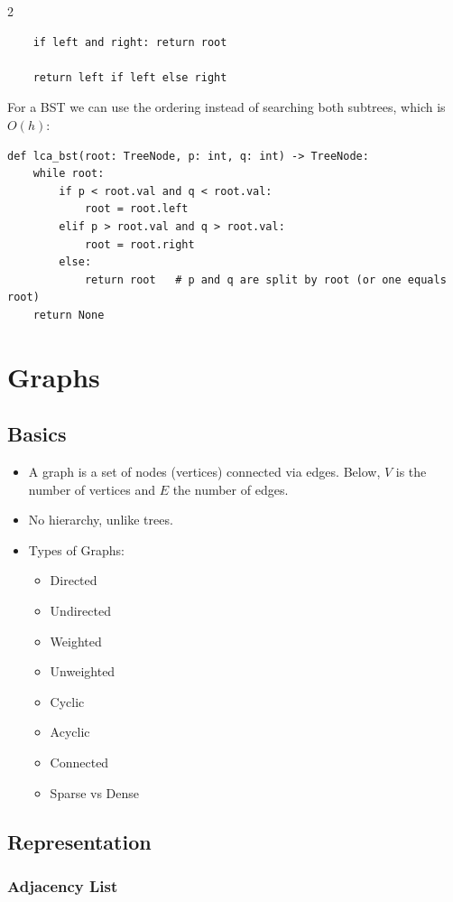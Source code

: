 \documentclass[9pt,a4paper]{extarticle}
\begin{document}
\begin{multicols}{2}
\begin{lstlisting}
    if left and right: return root

    return left if left else right
\end{lstlisting}

For a BST we can use the ordering instead of searching both subtrees, which is $O(h)$:


\begin{lstlisting}
def lca_bst(root: TreeNode, p: int, q: int) -> TreeNode:
    while root:
        if p < root.val and q < root.val:
            root = root.left
        elif p > root.val and q > root.val:
            root = root.right
        else:
            return root   # p and q are split by root (or one equals root)
    return None
\end{lstlisting}

\section{Graphs}

\subsection{Basics}

\begin{itemize}
\item A graph is a set of nodes (vertices) connected via edges. Below, $V$ is the number of vertices and $E$ the number of edges.
\item No hierarchy, unlike trees.
\item Types of Graphs:
\begin{itemize}
\item Directed
\item Undirected
\item Weighted
\item Unweighted
\item Cyclic
\item Acyclic
\item Connected
\item Sparse vs Dense
\end{itemize}
\end{itemize}

\subsection{Representation}

\subsubsection{Adjacency List}


\end{multicols}
\end{document}
